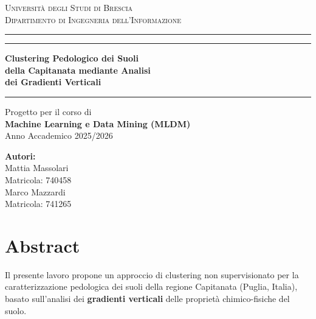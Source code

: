 \documentclass[a4paper,12pt]{article}
\begin{document}
\begin{titlepage}
    \centering
    \vspace*{\fill}

    {\Large\scshape Università degli Studi di Brescia\\[4pt]
    Dipartimento di Ingegneria dell'Informazione}

    \vspace{1.2cm}
    \rule{\textwidth}{0.4pt}
    \vspace{0.6cm}
    \rule{\textwidth}{0.4pt}
    \vspace{1cm}

    {\LARGE\bfseries Clustering Pedologico dei Suoli\\[15pt]
    della Capitanata mediante Analisi\\[15pt]
    dei Gradienti Verticali}

    \vspace{0.8cm}
    \rule{\textwidth}{0.4pt}

    \vspace{1.5cm}
    {\large Progetto per il corso di\\[6pt]
    \textbf{Machine Learning e Data Mining (MLDM)}\\[6pt]
    Anno Accademico 2025/2026}

    \vspace{2cm}

    {\large \textbf{Autori:}\\[6pt]
    Mattia Massolari\\
    Matricola: 740458\\[8pt]
    Marco Mazzardi\\
    Matricola: 741265}

    \vspace*{\fill}
\end{titlepage}

\tableofcontents
\newpage

\section{Abstract}

Il presente lavoro propone un approccio di clustering non supervisionato
per la caratterizzazione pedologica dei suoli della regione Capitanata
(Puglia, Italia), basato sull'analisi dei \textbf{gradienti verticali}
delle proprietà chimico-fisiche del suolo.
\end{document}
